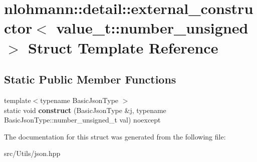 \hypertarget{structnlohmann_1_1detail_1_1external__constructor_3_01value__t_1_1number__unsigned_01_4}{}\section{nlohmann\+:\+:detail\+:\+:external\+\_\+constructor$<$ value\+\_\+t\+:\+:number\+\_\+unsigned $>$ Struct Template Reference}
\label{structnlohmann_1_1detail_1_1external__constructor_3_01value__t_1_1number__unsigned_01_4}
\subsection*{Static Public Member Functions}
\begin{DoxyCompactItemize}
\item 
\mbox{\label{structnlohmann_1_1detail_1_1external__constructor_3_01value__t_1_1number__unsigned_01_4_a17969b14852f43e04353858c87b0f539}} 
{\footnotesize template$<$typename Basic\+Json\+Type $>$ }\\static void {\bfseries construct} (Basic\+Json\+Type \&j, typename Basic\+Json\+Type\+::number\+\_\+unsigned\+\_\+t val) noexcept
\end{DoxyCompactItemize}


The documentation for this struct was generated from the following file\+:\begin{DoxyCompactItemize}
\item 
src/\+Utils/json.\+hpp\end{DoxyCompactItemize}
